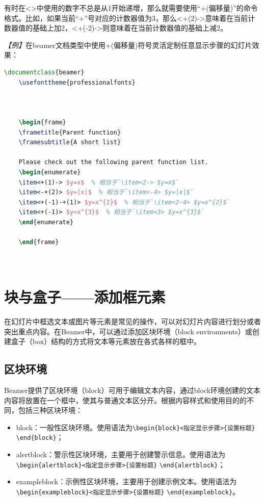 有时在<>中使用的数字不总是从1开始递增，那么就需要使用“+(偏移量)”的命令格式。比如，如果当前“+”号对应的计数器值为3，那么<+(2)->意味着在当前计数器值的基础上加2，<+(-2)->则意味着在当前计数器值的基础上减2。

\emph{【例】}在beamer文档类型中使用+(偏移量)符号灵活定制任意显示步骤的幻灯片效果：
\begin{lstlisting}[language=TeX]
    \documentclass{beamer}
    \usefonttheme{professionalfonts}

    

    \begin{frame}
    \frametitle{Parent function}
    \framesubtitle{A short list}

    Please check out the following parent function list.
    \begin{enumerate}
    \item<+(1)-> $y=x$  % 相当于`\item<2-> $y=x$`
    \item<-+(2)> $y=|x|$  % 相当于`\item<-4> $y=|x|$`
    \item<+(-1)-+(1)> $y=x^{2}$  % 相当于`\item<2-4> $y=x^{2}$`
    \item<+(-1)> $y=x^{3}$  % 相当于`\item<3> $y=x^{3}$`
    \end{enumerate}

    \end{frame}

    
\end{lstlisting}

\section{块与盒子——添加框元素}

在幻灯片中框选文本或图片等元素是常见的操作，可以对幻灯片内容进行划分或者突出重点内容。在Beamer中，可以通过添加区块环境（block environments）或创建盒子（box）结构的方式将文本等元素放在各式各样的框中。

\subsection{区块环境}

Beamer提供了区块环境（block）可用于编辑文本内容，通过block环境创建的文本内容将放置在一个框中，使其与普通文本区分开。根据内容样式和使用目的的不同，包括三种区块环境：
\begin{itemize}
    \item block：一般性区块环境。使用语法为\texttt{\textbackslash{}begin\{block\}<指定显示步骤>\{设置标题\}} \texttt{\textbackslash{}end\{block\}}；
    \item alertblock：警示性区块环境，主要用于创建警示信息。使用语法为\texttt{\textbackslash{}begin\{alertblock\}<指定显示步骤>\{设置标题\}}  \texttt{\textbackslash{}end\{alertblock\}}；
    \item exampleblock：示例性区块环境，主要用于创建示例文本。使用语法为\texttt{\textbackslash{}begin\{exampleblock\}<指定显示步骤>\{设置标题\}} \texttt{\textbackslash{}end\{exampleblock\}}。
\end{itemize}

